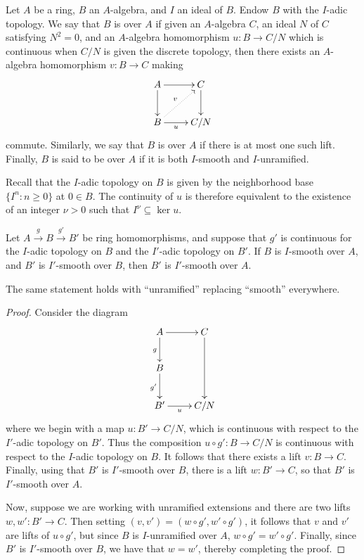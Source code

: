 \begin{definition}
    Let $A$ be a ring, $B$ an $A$-algebra, and $I$ an ideal of $B$. Endow $B$ with the $I$-adic topology. We say that $B$ is  over $A$ if given an $A$-algebra $C$, an ideal $N$ of $C$ satisfying $N^2 = 0$, and an $A$-algebra homomorphism $u\colon B\to C/N$ which is continuous when $C/N$ is given the discrete topology, then there exists an $A$-algebra homomorphism $v\colon B\to C$ making 
    \begin{equation*}
        \xymatrix {
            A\ar[d]\ar[r] & C\ar[d]\\
            B\ar[r]_-u\ar@{.>}[ru]^-v & C/N
        }
    \end{equation*}
    commute. Similarly, we say that $B$ is  over $A$ if there is at most one such lift. Finally, $B$ is said to be  over $A$ if it is both $I$-smooth and $I$-unramified.
\end{definition}

\begin{remark}
    Recall that the $I$-adic topology on $B$ is given by the neighborhood base $\{I^n\colon n\ge 0\}$ at $0\in B$. The continuity of $u$ is therefore equivalent to the existence of an integer $\nu > 0$ such that $I^\nu\subseteq\ker u$.
\end{remark}

\begin{theorem}[Transitivity]
    Let $A\xrightarrow{g} B\xrightarrow{g'} B'$ be ring homomorphisms, and suppose that $g'$ is continuous for the $I$-adic topology on $B$ and the $I'$-adic topology on $B'$. If $B$ is $I$-smooth over $A$, and $B'$ is $I'$-smooth over $B$, then $B'$ is $I'$-smooth over $A$. 

    The same statement holds with ``unramified'' replacing ``smooth'' everywhere.
\end{theorem}
\begin{proof}
    Consider the diagram 
    \begin{equation*}
        \xymatrix {
            A\ar[r]\ar[d]_g & C\ar[dd]\\
            B\ar[d]_{g'} & \\
            B'\ar[r]_-u & C/N
        }
    \end{equation*}
    where we begin with a map $u\colon B'\to C/N$, which is continuous with respect to the $I'$-adic topology on $B'$. Thus the composition $u\circ g'\colon B\to C/N$ is continuous with respect to the $I$-adic topology on $B$. It follows that there exists a lift $v\colon B\to C$. Finally, using that $B'$ is $I'$-smooth over $B$, there is a lift $w\colon B'\to C$, so that $B'$ is $I'$-smooth over $A$.

    Now, suppose we are working with unramified extensions and there are two lifts $w, w'\colon B'\to C$. Then setting $(v, v') = (w\circ g', w'\circ g')$, it follows that $v$ and $v'$ are lifts of $u\circ g'$, but since $B$ is $I$-unramified over $A$, $w\circ g' = w'\circ g'$. Finally, since $B'$ is $I'$-smooth over $B$, we have that $w = w'$, thereby completing the proof.
\end{proof}

